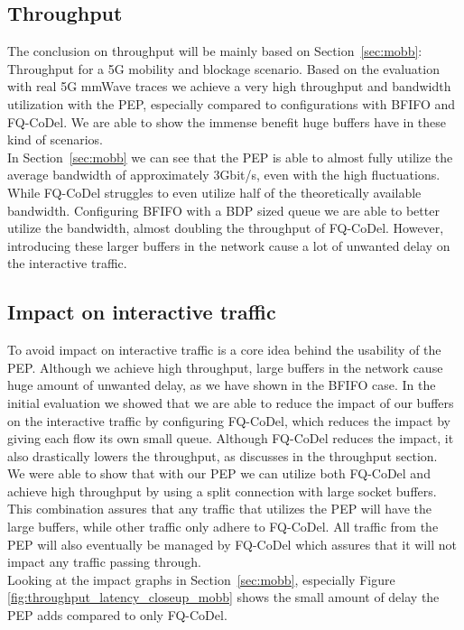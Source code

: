 \documentclass[a4paper,english, 11pt]{report}
\begin{document}
\subsection{Throughput}
The conclusion on throughput will be mainly based on Section~\ref{sec:mobb}: Throughput for a 5G mobility and blockage scenario. Based on the evaluation with real 5G mmWave traces we achieve a very high throughput and bandwidth utilization with the PEP, especially compared to configurations with BFIFO and FQ-CoDel. We are able to show the immense benefit huge buffers have in these kind of scenarios.\\

In Section~\ref{sec:mobb} we can see that the PEP is able to almost fully utilize the average bandwidth of approximately 3Gbit/s, even with the high fluctuations. While FQ-CoDel struggles to even utilize half of the theoretically available bandwidth. Configuring BFIFO with a BDP sized queue we are able to better utilize the bandwidth, almost doubling the throughput of FQ-CoDel. However, introducing these larger buffers in the network cause a lot of unwanted delay on the interactive traffic.

\subsection{Impact on interactive traffic}
To avoid impact on interactive traffic is a core idea behind the usability of the PEP. Although we achieve high throughput, large buffers in the network cause huge amount of unwanted delay, as we have shown in the BFIFO case. In the initial evaluation we showed that we are able to reduce the impact of our buffers on the interactive traffic by configuring FQ-CoDel, which reduces the impact by giving each flow its own small queue. Although FQ-CoDel reduces the impact, it also drastically lowers the throughput, as discusses in the throughput section.\\

We were able to show that with our PEP we can utilize both FQ-CoDel and achieve high throughput by using a split connection with large socket buffers. This combination assures that any traffic that utilizes the PEP will have the large buffers, while other traffic only adhere to FQ-CoDel. All traffic from the PEP will also eventually be managed by FQ-CoDel which assures that it will not impact any traffic passing through.\\

Looking at the impact graphs in Section~\ref{sec:mobb}, especially Figure \ref{fig:throughput_latency_closeup_mobb} shows the small amount of delay the PEP adds compared to only FQ-CoDel.
\end{document}
